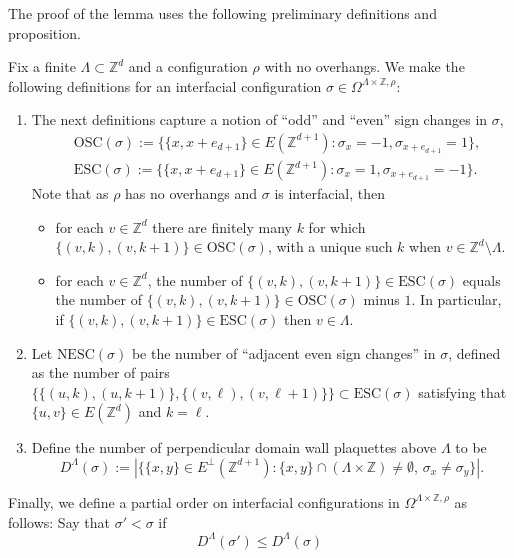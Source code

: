 \documentclass[11pt, reqno]{amsart}
\newcommand{\Z}{\mathbb{Z}}
\newcommand{\osc}{\text{OSC}}
\newcommand{\esc}{\text{ESC}}
\newcommand{\nesc}{\text{NESC}}
\numberwithin{equation}{section}
\begin{document}
The proof of the lemma uses the following preliminary definitions and proposition.

Fix a finite $\Lambda\subset\Z^d$ and a configuration $\rho$ with no overhangs. We make the following definitions for an interfacial configuration $\sigma\in\Omega^{\Lambda\times\Z,\rho}$:
\begin{enumerate}
\item 
The next definitions capture a notion of ``odd'' and ``even'' sign changes in $\sigma$,
\begin{equation}\label{eq:odd and even sign changes}
\begin{split}
&\osc(\sigma):=\{\{x,x+e_{d+1}\}\in E(\Z^{d+1})\colon \sigma_x = -1, \sigma_{x+e_{d+1}}=1\},\\
&\esc(\sigma):=\{\{x,x+e_{d+1}\}\in E(\Z^{d+1})\colon \sigma_x = 1, \sigma_{x+e_{d+1}}=-1\}.
\end{split}
\end{equation}
Note that as $\rho$ has no overhangs and $\sigma$ is interfacial, then
\begin{itemize}
\item 
for each $v\in\Z^d$ there are finitely many $k$ for which $\{(v,k),(v,k+1)\}\in\osc(\sigma)$, with a unique such $k$ when $v\in\Z^d\setminus\Lambda$.
\item 
for each $v\in\Z^d$, the number of $\{(v,k),(v,k+1)\}\in\esc(\sigma)$ equals the number of $\{(v,k),(v,k+1)\}\in\osc(\sigma)$ minus $1$. In particular,
if $\{(v,k),(v,k+1)\}\in\esc(\sigma)$ then $v\in\Lambda$.
\end{itemize}
\item 
Let $\nesc(\sigma)$ be the number of ``adjacent even sign changes'' in $\sigma$, defined as the number of pairs $\{\{(u,k),(u,k+1)\}, \{(v,\ell),(v,\ell+1)\}\}\subset\esc(\sigma)$ satisfying that $\{u,v\}\in E(\Z^d)$ and $k=\ell$.
\item 
Define the number of perpendicular domain wall plaquettes above $\Lambda$ to be
\begin{equation*}
D^\Lambda(\sigma):=|\{\{x,y\}\in E^{\perp}(\Z^{d+1}) \colon \{x,y\}\cap(\Lambda\times \Z)\neq\emptyset,\, \sigma_x\neq\sigma_y\}|.
\end{equation*}
\end{enumerate}
Finally, we define a partial order on interfacial configurations in $\Omega^{\Lambda\times\Z,\rho}$ as follows: Say that $\sigma'<\sigma$ if \begin{equation*}
D^\Lambda(\sigma')\le D^\Lambda(\sigma)
\end{equation*}
\end{document}
